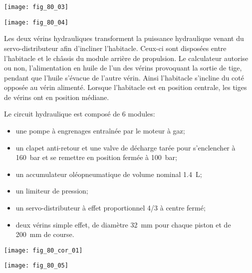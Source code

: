 \begin{center}
\texttt{[image: fig\_80\_03]}
\end{center}

\begin{center}
\texttt{[image: fig\_80\_04]}
\end{center}


Les deux vérins hydrauliques transforment la puissance hydraulique venant du servo-distributeur afin d’incliner l’habitacle. Ceux-ci sont disposées entre l’habitacle et le châssis du module arrière de propulsion. Le calculateur autorise ou non, l’alimentation en huile de l’un des vérins provoquant la sortie de tige, pendant que l’huile s'évacue de l’autre vérin. Ainsi l’habitacle s'incline du coté opposée au vérin alimenté. Lorsque l’habitacle est en position centrale, les tiges de vérins ont en position médiane.


Le circuit hydraulique est composé de 6 modules:
\begin{itemize}
\item une pompe à engrenages entraînée par le moteur à gaz;
\item un clapet anti-retour et une valve de décharge tarée pour s’enclencher à \SI{160}{bar} et se remettre en position fermée à \SI{100}{bar};
\item un accumulateur oléopneumatique de volume nominal \SI{1,4}{L};
\item un limiteur de pression;
\item un servo-distributeur à effet proportionnel 4/3 à centre fermé;
\item deux vérins simple effet, de diamètre \SI{32}{mm} pour chaque piston et de \SI{200}{mm} de course.
\end{itemize}

\fi


\ifprof
\begin{corrige}
\begin{center}
\texttt{[image: fig\_80\_cor\_01]}
\end{center}
\end{corrige}
\else\begin{center}
\texttt{[image: fig\_80\_05]}
\end{center}

